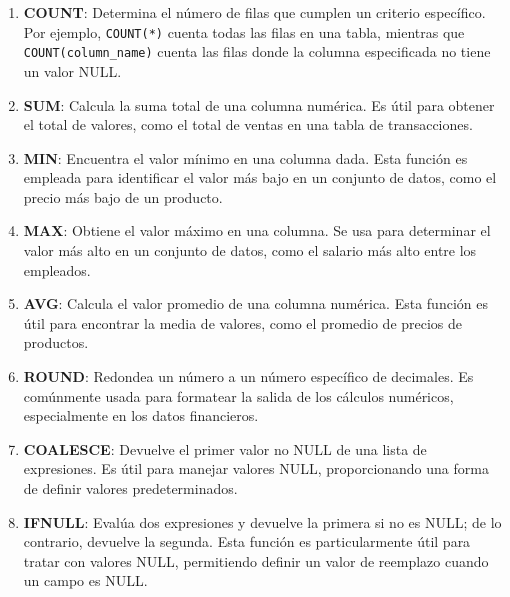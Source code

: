             \begin{enumerate}
                \item \textbf{COUNT}: Determina el número de filas que cumplen un criterio específico. Por ejemplo, \texttt{COUNT(*)} cuenta todas las filas en una tabla, mientras que \texttt{COUNT(column\_name)} cuenta las filas donde la columna especificada no tiene un valor NULL.
                
                \item \textbf{SUM}: Calcula la suma total de una columna numérica. Es útil para obtener el total de valores, como el total de ventas en una tabla de transacciones.
                
                \item \textbf{MIN}: Encuentra el valor mínimo en una columna dada. Esta función es empleada para identificar el valor más bajo en un conjunto de datos, como el precio más bajo de un producto.
                
                \item \textbf{MAX}: Obtiene el valor máximo en una columna. Se usa para determinar el valor más alto en un conjunto de datos, como el salario más alto entre los empleados.
                
                \item \textbf{AVG}: Calcula el valor promedio de una columna numérica. Esta función es útil para encontrar la media de valores, como el promedio de precios de productos.
                
                \item \textbf{ROUND}: Redondea un número a un número específico de decimales. Es comúnmente usada para formatear la salida de los cálculos numéricos, especialmente en los datos financieros.
                
                \item \textbf{COALESCE}: Devuelve el primer valor no NULL de una lista de expresiones. Es útil para manejar valores NULL, proporcionando una forma de definir valores predeterminados.
                
                \item \textbf{IFNULL}: Evalúa dos expresiones y devuelve la primera si no es NULL; de lo contrario, devuelve la segunda. Esta función es particularmente útil para tratar con valores NULL, permitiendo definir un valor de reemplazo cuando un campo es NULL.
            \end{enumerate}
        
